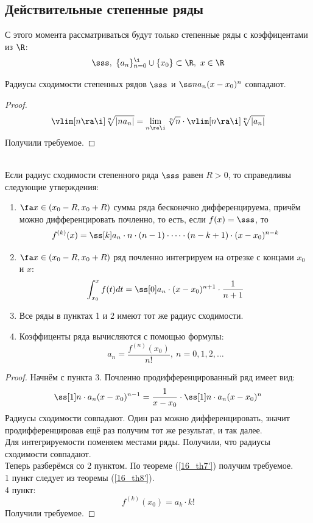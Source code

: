\subsection{Действительные степенные ряды}
\begin{note}
	С этого момента рассматриваться будут только степенные ряды с коэффицентами из $\R$:
	\[\sss,\ \{a_n\}_{n=0}^\i\cup\{x_0\}\subset\R,\ x\in\R\]
\end{note}
\begin{lemma}
	Радиусы сходимости степенных рядов $\sss$ и $\ss na_n(x-x_0)^n$ совпадают.
\end{lemma}
\begin{proof}
	\[\vlim[n\ra\i]\sqrt[n]{|na_n|}=\lim_{n\ra\i}\sqrt[n]{n}\cdot\vlim[n\ra\i]\sqrt[n]{|a_n|}\]
	Получили требуемое.
\end{proof}
\begin{theorem}\label{17_th5}\\
	Если радиус сходимости степенного ряда $\sss$ равен $R>0$, то справедливы следующие утверждения:
	\begin{enumerate}
		\item $\fa x\in(x_0-R,x_0+R)$ сумма ряда бесконечно дифференцируема, причём можно дифференцировать почленно, то есть, если $f(x)=\sss$, то \[f^{(k)}(x)=\ss[k]a_n\cdot n\cdot (n-1)\cdot\dots\cdot(n-k+1)\cdot(x-x_0)^{n-k}\]
		\item $\fa x\in(x_0-R,x_0+R)$ ряд почленно интегрируем на отрезке с концами $x_0$ и $x$:
		\[\int_{x_0}^xf(t)dt=\ss[0] a_n\cdot(x-x_0)^{n+1}\cdot\frac1{n+1}\]
		\item Все ряды в пунктах 1 и 2 имеют тот же радиус сходимости.
		\item Коэффиценты ряда вычисляются с помощью формулы:
		\[a_n=\frac{f^{(n)}(x_0)}{n!},\ n=0,1,2,\dots\]
	\end{enumerate}
\end{theorem}
\begin{proof}
	Начнём с пункта 3. Почленно продифференцированный ряд имеет вид:
	\[\ss[1]n\cdot a_n(x-x_0)^{n-1}=\frac1{x-x_0}\cdot\ss[1]n\cdot a_n(x-x_0)^n\]
	Радиусы сходимости совпадают. Один раз можно дифференцировать, значит продифференцировав ещё раз получим тот же результат, и так далее.\\
	Для интегрируемости поменяем местами ряды. Получили, что радиусы сходимости совпадают.\\
	Теперь разберёмся со 2 пунктом. По теореме (\ref{16_th7'}) получим требуемое.\\
	1 пункт следует из теоремы (\ref{16_th8'}).\\
	4 пункт:
	\[f^{(k)}(x_0)=a_k\cdot k!\]
	Получили требуемое.
\end{proof}
